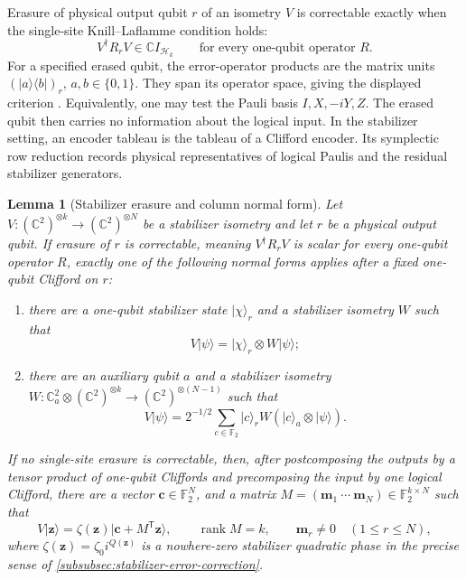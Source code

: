\documentclass[11pt,letterpaper,onecolumn]{article}
\theoremstyle{plain}
\newtheorem{lemma}[lemma]{Lemma}
\theoremstyle{definition}
\theoremstyle{remark}
\newcommand{\Ftwo}{\mathbb F_2}
\newcommand{\rank}{\operatorname{rank}}
\begin{document}
Erasure of physical output qubit \(r\) of an isometry \(V\) is correctable exactly
when the single-site Knill--Laflamme condition holds:
\[
 V^\dagger R_rV\in\mathbb C I_{\mathcal H_k}
 \qquad\text{for every one-qubit operator }R.
\]
For a specified erased qubit, the error-operator products are the
matrix units \((\lvert a\rangle\langle b\rvert)_r\), \(a,b\in\{0,1\}\).
They span its operator space, giving the displayed criterion
\cite{KnillLaflamme1997}. Equivalently, one may test the Pauli basis
\(I,X,-iY,Z\). The erased qubit then carries no information about the
logical input.
In the stabilizer setting, an encoder tableau is the tableau of a Clifford
encoder. Its symplectic row reduction records physical representatives of logical Paulis and the residual stabilizer generators.

\begin{lemma}[Stabilizer erasure and column normal form]
\label{lem:stabilizer-erasure-column-normal-form}
Let
\(
 V:(\mathbb C^2)^{\otimes k}\to(\mathbb C^2)^{\otimes N}
\)
be a stabilizer isometry and let \(r\) be a physical output qubit.  If
erasure of \(r\) is correctable, meaning
\(V^\dagger R_rV\) is scalar for every one-qubit operator \(R\),
exactly one of the following normal forms applies after a fixed one-qubit
Clifford on \(r\):
\begin{enumerate}
\item there are a one-qubit stabilizer state \(\lvert\chi\rangle_r\) and a
      stabilizer isometry \(W\) such that
      \begin{equation}
       V\lvert\psi\rangle
       =\lvert\chi\rangle_r\otimes W\lvert\psi\rangle;
       \label{eq:stabilizer-erasure-pure}
      \end{equation}
\item there are an auxiliary qubit \(a\) and a stabilizer isometry
      \(
       W:\mathbb C^2_a\otimes(\mathbb C^2)^{\otimes k}
       \to(\mathbb C^2)^{\otimes(N-1)}
      \)
      such that
      \begin{equation}
       V\lvert\psi\rangle
       =2^{-1/2}\sum_{c\in\Ftwo}
        \lvert c\rangle_r W(\lvert c\rangle_a\otimes\lvert\psi\rangle).
       \label{eq:stabilizer-erasure-mixed}
      \end{equation}
\end{enumerate}
If no single-site erasure is correctable, then, after postcomposing the
outputs by a tensor product of one-qubit Cliffords and precomposing the input
by one logical Clifford, there are a vector
\({\mathbf{c}}\in\Ftwo^N\), and a matrix
\(M=({\mathbf{m}}_1\ \cdots\ {\mathbf{m}}_N)\in\Ftwo^{k\times N}\) such that
\begin{equation}
 V\lvert {\mathbf z}\rangle
 =\zeta({\mathbf z})\lvert {\mathbf{c}}+M^{\mathsf T}{\mathbf z}\rangle,
 \qquad \rank M=k,\qquad {\mathbf{m}}_r\ne0\quad(1\le r\le N),
 \label{eq:stabilizer-column-normal-form}
\end{equation}
where \(\zeta({\mathbf z})=\zeta_0i^{Q({\mathbf z})}\) is a nowhere-zero stabilizer quadratic
phase in the precise sense of
\cref{subsubsec:stabilizer-error-correction}.
\end{lemma}
\end{document}
